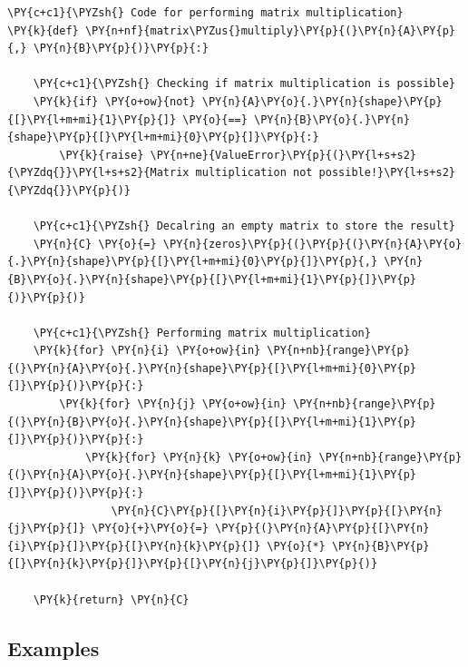     \begin{tcolorbox}[breakable, size=fbox, boxrule=1pt, pad at break*=1mm,colback=cellbackground, colframe=cellborder]
\begin{Verbatim}[commandchars=\\\{\}]
\PY{c+c1}{\PYZsh{} Code for performing matrix multiplication}
\PY{k}{def} \PY{n+nf}{matrix\PYZus{}multiply}\PY{p}{(}\PY{n}{A}\PY{p}{,} \PY{n}{B}\PY{p}{)}\PY{p}{:}

    \PY{c+c1}{\PYZsh{} Checking if matrix multiplication is possible}
    \PY{k}{if} \PY{o+ow}{not} \PY{n}{A}\PY{o}{.}\PY{n}{shape}\PY{p}{[}\PY{l+m+mi}{1}\PY{p}{]} \PY{o}{==} \PY{n}{B}\PY{o}{.}\PY{n}{shape}\PY{p}{[}\PY{l+m+mi}{0}\PY{p}{]}\PY{p}{:}
        \PY{k}{raise} \PY{n+ne}{ValueError}\PY{p}{(}\PY{l+s+s2}{\PYZdq{}}\PY{l+s+s2}{Matrix multiplication not possible!}\PY{l+s+s2}{\PYZdq{}}\PY{p}{)}

    \PY{c+c1}{\PYZsh{} Decalring an empty matrix to store the result}
    \PY{n}{C} \PY{o}{=} \PY{n}{zeros}\PY{p}{(}\PY{p}{(}\PY{n}{A}\PY{o}{.}\PY{n}{shape}\PY{p}{[}\PY{l+m+mi}{0}\PY{p}{]}\PY{p}{,} \PY{n}{B}\PY{o}{.}\PY{n}{shape}\PY{p}{[}\PY{l+m+mi}{1}\PY{p}{]}\PY{p}{)}\PY{p}{)}

    \PY{c+c1}{\PYZsh{} Performing matrix multiplication}
    \PY{k}{for} \PY{n}{i} \PY{o+ow}{in} \PY{n+nb}{range}\PY{p}{(}\PY{n}{A}\PY{o}{.}\PY{n}{shape}\PY{p}{[}\PY{l+m+mi}{0}\PY{p}{]}\PY{p}{)}\PY{p}{:}
        \PY{k}{for} \PY{n}{j} \PY{o+ow}{in} \PY{n+nb}{range}\PY{p}{(}\PY{n}{B}\PY{o}{.}\PY{n}{shape}\PY{p}{[}\PY{l+m+mi}{1}\PY{p}{]}\PY{p}{)}\PY{p}{:}
            \PY{k}{for} \PY{n}{k} \PY{o+ow}{in} \PY{n+nb}{range}\PY{p}{(}\PY{n}{A}\PY{o}{.}\PY{n}{shape}\PY{p}{[}\PY{l+m+mi}{1}\PY{p}{]}\PY{p}{)}\PY{p}{:}
                \PY{n}{C}\PY{p}{[}\PY{n}{i}\PY{p}{]}\PY{p}{[}\PY{n}{j}\PY{p}{]} \PY{o}{+}\PY{o}{=} \PY{p}{(}\PY{n}{A}\PY{p}{[}\PY{n}{i}\PY{p}{]}\PY{p}{[}\PY{n}{k}\PY{p}{]} \PY{o}{*} \PY{n}{B}\PY{p}{[}\PY{n}{k}\PY{p}{]}\PY{p}{[}\PY{n}{j}\PY{p}{]}\PY{p}{)}

    \PY{k}{return} \PY{n}{C}
\end{Verbatim}
\end{tcolorbox}

    \hypertarget{examples}{%
\subsection{Examples}\label{examples}}

